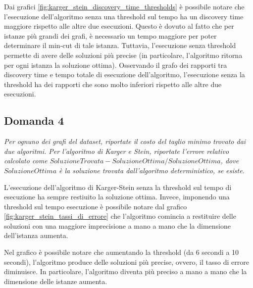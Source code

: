 Dai grafici \ref{fig:karger_stein_discovery_time_thresholds} è possibile notare che 
l'esecuzione dell'algoritmo senza una threshold sul tempo ha un discovery 
time maggiore rispetto alle altre due esecuzioni. Questo è dovuto al fatto che per 
istanze più grandi dei grafi, è necessario un tempo maggiore per poter determinare 
il min-cut di tale istanza. Tuttavia, l'esecuzione senza threshold permette di avere 
delle soluzioni più precise (in particolare, l'algoritmo ritorna per ogni istanza la 
soluzione ottima). Osservando il grafo dei rapporti tra discovery time e tempo totale 
di esecuzione dell'algoritmo, l'esecuzione senza la threshold ha dei rapporti che sono 
molto inferiori rispetto alle altre due esecuzioni.

\subsection{Domanda 4}
\textit{Per ognuno dei grafi del dataset, riportate il costo del taglio minimo trovato dai due algoritmi. Per l'algoritmo di Karger e Stein, riportate l'errore relativo calcolato come $SoluzioneTrovata-SoluzioneOttima/SoluzioneOttima$, dove $SoluzioneOttima$ è la soluzione trovata dall'algoritmo deterministico, se esiste.}

L'esecuzione dell'algoritmo di Karger-Stein senza la threshold sul 
tempo di esecuzione ha sempre restiuito la soluzione ottima. Invece, 
imponendo una threshold sul tempo esecuzione è possibile notare dal 
grafico \ref{fig:karger_stein_tassi_di_errore} che l'algoritmo 
comincia a restituire delle soluzioni con una maggiore imprecisione 
a mano a mano che la dimensione dell'istanza aumenta.

Nel grafico è possibile notare che aumentando la threshold 
(da 6 secondi a 10 secondi), l'algoritmo produce delle soluzioni più 
precise, ovvero, il tasso di errore diminuisce. In particolare, 
l'algoritmo diventa più preciso a mano a mano che la dimensione delle 
istanze aumenta.

